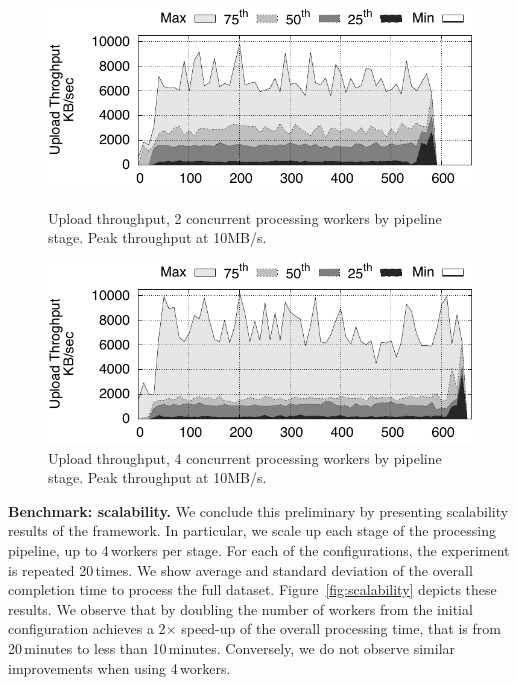 \begin{figure}[t!]
  \centering
  \includegraphics[scale=0.7]{images/tput_upload_4-datas-2-workers.pdf}
  \caption{Upload throughput, 2 concurrent processing workers by pipeline stage. Peak throughput at 10MB/s.}
  \label{fig:throughput2}
  \vspace{0.5cm}
  \includegraphics[scale=0.7]{images/tput_upload_4-datas-4-workers.pdf}
  \caption{Upload throughput, 4 concurrent processing workers by pipeline stage. Peak throughput at 10MB/s.}
  \label{fig:throughput4}
\end{figure}

\textbf{Benchmark: scalability.} We conclude this preliminary by presenting scalability results of the \SYS framework.
In particular, we scale up each stage of the processing pipeline, up to 4\,workers per stage.
For each of the configurations, the experiment is repeated 20\,times.
We show average and standard deviation of the overall completion time to process the full dataset.
Figure~\ref{fig:scalability} depicts these results.
We observe that by doubling the number of workers from the initial configuration achieves a 2$\times$ speed-up of the overall processing time, that is from 20\,minutes to less than 10\,minutes.
Conversely, we do not observe similar improvements when using 4\,workers.


